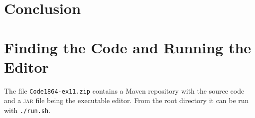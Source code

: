 \documentclass[a4paper,draft,12pt,oneside,article,table]{memoir}
\begin{document}
\chapter{Conclusion}

\appendix

\chapter{Finding the Code and Running the Editor}

The file \texttt{Code1864-ex11.zip} contains a Maven repository with the source
code and a \textsc{jar} file being the executable editor. From the
root directory it can be run with \texttt{./run.sh}.


\setlength{\RaggedRightRightskip}{0pt plus 4em} %
\RaggedRight
\printbibliography
\end{document}
